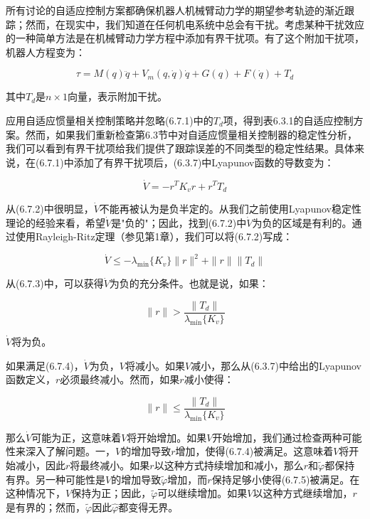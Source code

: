 \documentclass[12pt,a4paper]{ctexart}
\begin{document}
所有讨论的自适应控制方案都确保机器人机械臂动力学的期望参考轨迹的渐近跟踪；然而，在现实中，我们知道在任何机电系统中总会有干扰。考虑某种干扰效应的一种简单方法是在机械臂动力学方程中添加有界干扰项。有了这个附加干扰项，机器人方程变为：

\begin{equation}\label{eq:6.7.1}
\tau = M(q)\ddot{q} + V_m(q, \dot{q})\dot{q} + G(q) + F(\dot{q}) + T_d
\end{equation}

其中$T_d$是$n \times 1$向量，表示附加干扰。

应用自适应惯量相关控制策略并忽略(6.7.1)中的$T_d$项，得到表6.3.1的自适应控制方案。然而，如果我们重新检查第6.3节中对自适应惯量相关控制器的稳定性分析，我们可以看到有界干扰项给我们提供了跟踪误差的不同类型的稳定性结果。具体来说，在(6.7.1)中添加了有界干扰项后，(6.3.7)中Lyapunov函数的导数变为：

\begin{equation}\label{eq:6.7.2}
\dot{V} = -r^T K_v r + r^T T_d
\end{equation}

从(6.7.2)中很明显，$\dot{V}$不能再被认为是负半定的。从我们之前使用Lyapunov稳定性理论的经验来看，希望$\dot{V}$是"负的"；因此，找到(6.7.2)中$\dot{V}$为负的区域是有利的。通过使用Rayleigh-Ritz定理（参见第1章），我们可以将(6.7.2)写成：

\begin{equation}\label{eq:6.7.3}
\dot{V} \leq -\lambda_{\min}\{K_v\}\|r\|^2 + \|r\|\|T_d\|
\end{equation}

从(6.7.3)中，可以获得$\dot{V}$为负的充分条件。也就是说，如果：

\begin{equation}\label{eq:6.7.4}
\|r\| > \frac{\|T_d\|}{\lambda_{\min}\{K_v\}}
\end{equation}

$\dot{V}$将为负。

如果满足(6.7.4)，$\dot{V}$为负，$V$将减小。如果$V$减小，那么从(6.3.7)中给出的Lyapunov函数定义，$r$必须最终减小。然而，如果$r$减小使得：

\begin{equation}\label{eq:6.7.5}
\|r\| \leq \frac{\|T_d\|}{\lambda_{\min}\{K_v\}}
\end{equation}

那么$\dot{V}$可能为正，这意味着$V$将开始增加。如果$V$开始增加，我们通过检查两种可能性来深入了解问题。一，$V$的增加导致$r$增加，使得(6.7.4)被满足。这意味着$V$将开始减小，因此$r$将最终减小。如果$r$以这种方式持续增加和减小，那么$r$和$\tilde{\varphi}$都保持有界。另一种可能性是$V$的增加导致$\tilde{\varphi}$增加，而$r$保持足够小使得(6.7.5)被满足。在这种情况下，$V$保持为正；因此，$\tilde{\varphi}$可以继续增加。如果$V$以这种方式继续增加，$r$是有界的；然而，$\tilde{\varphi}$因此$\hat{\varphi}$都变得无界。
\end{document}
